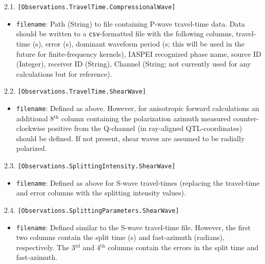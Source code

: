 2.1. \texttt{[Observations.TravelTime.CompressionalWave]}
\begin{itemize}
\item \texttt{filename}: Path (String) to file containing P-wave travel-time data. Data should be written to a \texttt{csv}-formatted file with the following columns, travel-time (s), error (s), dominant waveform period (s; this will be used in the future for finite-frequency kernels), IASPEI recognized phase name, source ID (Integer), receiver ID (String), Channel (String; not currently used for any calculations but for reference).
\end{itemize}
2.2. \texttt{[Observations.TravelTime.ShearWave]}
\begin{itemize}
\item \texttt{filename}: Defined as above. However, for anisotropic forward calculations an additional 8$^{\text{th}}$ column containing the polarization azimuth measured counter-clockwise positive from the Q-channel (in ray-aligned QTL-coordinates) should be defined. If not present, shear waves are assumed to be radially polarized.
\end{itemize}
2.3. \texttt{[Observations.SplittingIntensity.ShearWave]}
\begin{itemize}
\item \texttt{filename}: Defined as above for S-wave travel-times (replacing the travel-time and error columns with the splitting intensity values).
\end{itemize}
2.4. \texttt{[Observations.SplittingParameters.ShearWave]}
\begin{itemize}
\item \texttt{filename}: Defined similar to the S-wave travel-time file. However, the first two columns contain the split time (s) and fast-azimuth (radians), respectively. The 3$^{\text{rd}}$ and 4$^{\text{th}}$ columns contain the errors in the split time and fast-azimuth.
\end{itemize}

